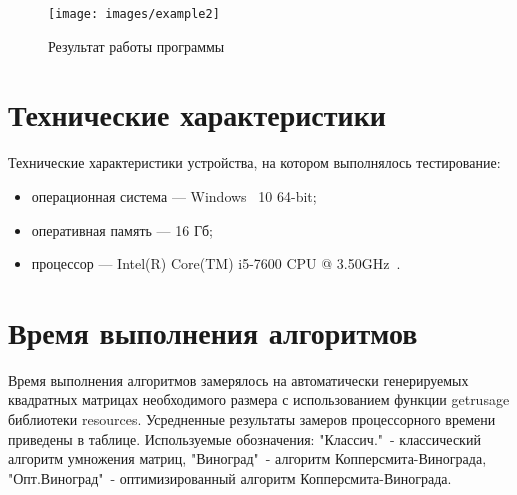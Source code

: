 \documentclass[12pt]{report}
\begin{document}
    \begin{figure}[H]
        \centering
        \texttt{[image: images/example2]}
        \caption{Результат работы программы}
        \label{fig:work_example2}
    \end{figure}


    \section{Технические характеристики}
    Технические характеристики устройства, на котором выполнялось тестирование:
    \begin{itemize}
        \item операционная система --- Windows~\cite{windows} 10 64-bit;
        \item оперативная память --- 16 Гб;
        \item процессор --- Intel(R) Core(TM) i5-7600 CPU @ 3.50GHz~\cite{i5}.
    \end{itemize}


    \section{Время выполнения алгоритмов}

    Время выполнения алгоритмов замерялось на автоматически генерируемых
    квадратных матрицах необходимого размера с использованием функции getrusage библиотеки resources.
    Усредненные результаты замеров процессорного времени приведены в таблице.
    Используемые обозначения:
    "Классич."\ - классический алгоритм умножения матриц,
    "Виноград"\ - алгоритм Копперсмита-Винограда,
    "Опт.Виноград"\ - оптимизированный алгоритм Копперсмита-Винограда.
\end{document}
